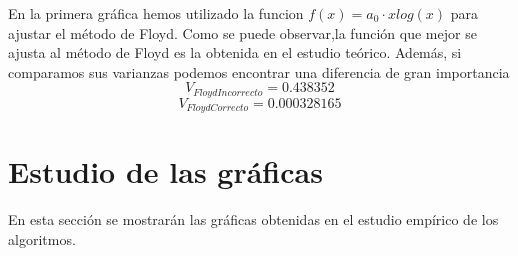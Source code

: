 \documentclass[11pt]{article}
\begin{document}
En la primera gráfica hemos utilizado la funcion $f(x)=a_0 \cdot xlog(x)$ para ajustar el método de 
Floyd. Como se puede observar,la función que mejor se ajusta al método de Floyd es la obtenida 
en el estudio teórico. Además, si comparamos sus varianzas podemos encontrar una diferencia de 
gran importancia
\begin{equation*}
    V_{FloydIncorrecto}=0.438352
\end{equation*}
\begin{equation*}
    V_{FloydCorrecto}=0.000328165
\end{equation*}




\section{Estudio de las gráficas}
    En esta sección se mostrarán las gráficas obtenidas en el estudio empírico de los algoritmos. 
\end{document}
